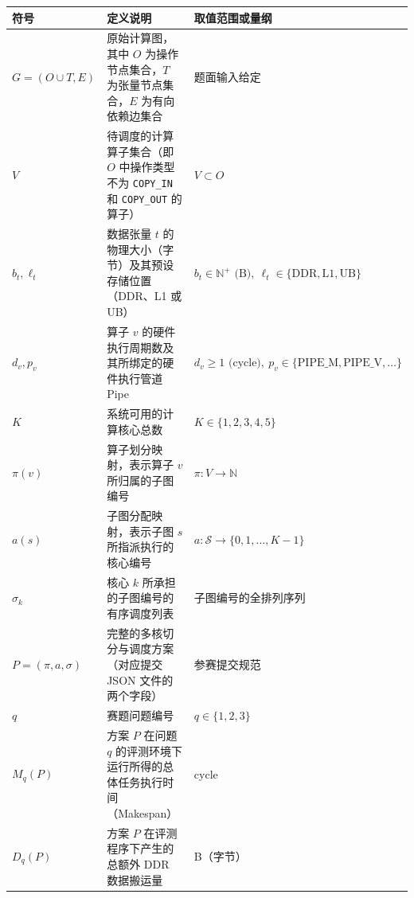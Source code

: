 \documentclass[anonymous,notoc]{gmcm2026}
\begin{document}
{\def\LTcaptype{table} %
\begin{longtable}[]{@{}
  >{\raggedright\arraybackslash}p{}
  >{\raggedright\arraybackslash}p{}
  >{\raggedright\arraybackslash}p{}@{}}
\toprule\noalign{}
\begin{minipage}[b]{\linewidth}\raggedright
符号
\end{minipage} & \begin{minipage}[b]{\linewidth}\raggedright
定义说明
\end{minipage} & \begin{minipage}[b]{\linewidth}\raggedright
取值范围或量纲
\end{minipage} \\
\midrule\noalign{}
\endhead
\bottomrule\noalign{}
\endlastfoot
\(G=(O\cup T, E)\) & 原始计算图，其中 \(O\) 为操作节点集合，\(T\) 为张量节点集合，\(E\) 为有向依赖边集合 & 题面输入给定 \\
\(V\) & 待调度的计算算子集合（即 \(O\) 中操作类型不为 \texttt{COPY\_IN} 和 \texttt{COPY\_OUT} 的算子） & \(V \subset O\) \\
\(b_t, \ell_t\) & 数据张量 \(t\) 的物理大小（字节）及其预设存储位置（DDR、L1 或 UB） & \(b_t \in \mathbb{N}^+ \text{ (B)},\ \ell_t \in \{\text{DDR}, \text{L1}, \text{UB}\}\) \\
\(d_v, p_v\) & 算子 \(v\) 的硬件执行周期数及其所绑定的硬件执行管道 Pipe & \(d_v \ge 1 \text{ (cycle)},\ p_v \in \{\text{PIPE\_M}, \text{PIPE\_V}, \dots\}\) \\
\(K\) & 系统可用的计算核心总数 & \(K \in \{1, 2, 3, 4, 5\}\) \\
\(\pi(v)\) & 算子划分映射，表示算子 \(v\) 所归属的子图编号 & \(\pi: V \to \mathbb{N}\) \\
\(a(s)\) & 子图分配映射，表示子图 \(s\) 所指派执行的核心编号 & \(a: \mathcal{S} \to \{0, 1, \dots, K-1\}\) \\
\(\sigma_k\) & 核心 \(k\) 所承担的子图编号的有序调度列表 & 子图编号的全排列序列 \\
\(P=(\pi, a, \sigma)\) & 完整的多核切分与调度方案（对应提交 JSON 文件的两个字段） & 参赛提交规范 \\
\(q\) & 赛题问题编号 & \(q \in \{1, 2, 3\}\) \\
\(M_q(P)\) & 方案 \(P\) 在问题 \(q\) 的评测环境下运行所得的总体任务执行时间（Makespan） & cycle \\
\(D_q(P)\) & 方案 \(P\) 在评测程序下产生的总额外 DDR 数据搬运量 & B（字节） \\

\end{longtable}}
\end{document}
